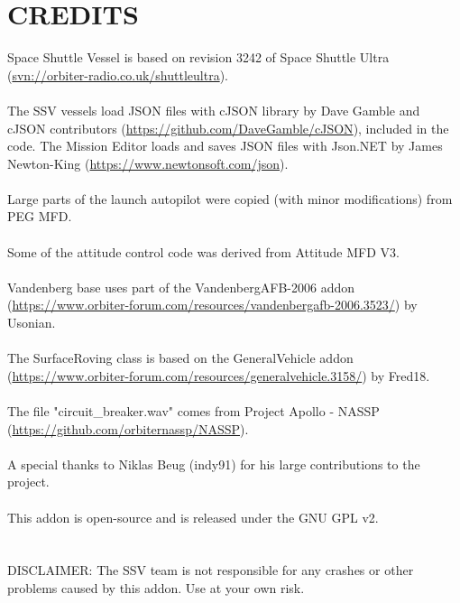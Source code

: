 \documentclass[Space_Shuttle_Vessel_Manual.tex]{subfiles}
\begin{document}
\section{CREDITS}
Space Shuttle Vessel is based on revision 3242 of Space Shuttle Ultra (\url{svn://orbiter-radio.co.uk/shuttleultra}).\\
\\
The SSV vessels load JSON files with cJSON library by Dave Gamble and cJSON contributors (\url{https://github.com/DaveGamble/cJSON}), included in the code. The Mission Editor loads and saves JSON files with Json.NET by James Newton-King (\url{https://www.newtonsoft.com/json}).\\
\\
Large parts of the launch autopilot were copied (with minor modifications) from PEG MFD.\\
\\
Some of the attitude control code was derived from Attitude MFD V3.\\
\\
Vandenberg base uses part of the VandenbergAFB-2006 addon (\url{https://www.orbiter-forum.com/resources/vandenbergafb-2006.3523/}) by Usonian.\\
\\
The SurfaceRoving class is based on the GeneralVehicle addon (\url{https://www.orbiter-forum.com/resources/generalvehicle.3158/}) by Fred18.\\
\\
The file "circuit\_breaker.wav" comes from Project Apollo - NASSP (\url{https://github.com/orbiternassp/NASSP}).\\
\\
A special thanks to Niklas Beug (indy91) for his large contributions to the project.\\
\\
This addon is open-source and is released under the GNU GPL v2.\\
\\
\\
DISCLAIMER: The SSV team is not responsible for any crashes or other problems caused by this addon. Use at your own risk.
\end{document}
